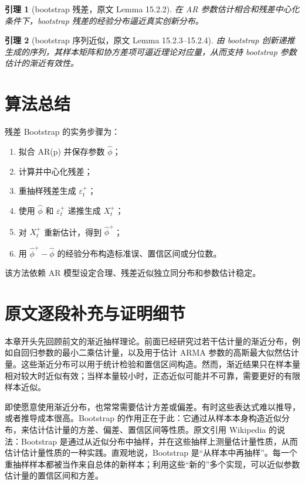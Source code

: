 \documentclass[11pt,a4paper]{ctexart}
\newtheorem{lemma}{引理}[section]
\begin{document}
\begin{lemma}[bootstrap 残差，原文 Lemma 15.2.2]
在 AR 参数估计相合和残差中心化条件下，bootstrap 残差的经验分布逼近真实创新分布。
\end{lemma}

\begin{lemma}[bootstrap 序列近似，原文 Lemma 15.2.3--15.2.4]
由 bootstrap 创新递推生成的序列，其样本矩阵和协方差项可逼近理论对应量，从而支持 bootstrap 参数估计的渐近有效性。
\end{lemma}

\section{算法总结}

残差 Bootstrap 的实务步骤为：
\begin{enumerate}
  \item 拟合 AR(p) 并保存参数 \(\hat\phi\)；
  \item 计算并中心化残差；
  \item 重抽样残差生成 \(\varepsilon_t^+\)；
  \item 使用 \(\hat\phi\) 和 \(\varepsilon_t^+\) 递推生成 \(X_t^+\)；
  \item 对 \(X_t^+\) 重新估计，得到 \(\hat\phi^+\)；
  \item 用 \(\hat\phi^+-\hat\phi\) 的经验分布构造标准误、置信区间或分位数。
\end{enumerate}

该方法依赖 AR 模型设定合理、残差近似独立同分布和参数估计稳定。

\section{原文逐段补充与证明细节}

本章开头先回顾前文的渐近抽样理论。前面已经研究过若干估计量的渐近分布，例如自回归参数的最小二乘估计量，以及用于估计 ARMA 参数的高斯最大似然估计量。这些渐近分布可以用于统计检验和置信区间构造。然而，渐近结果只在样本量相对较大时近似有效；当样本量较小时，正态近似可能并不可靠，需要更好的有限样本近似。

即使愿意使用渐近分布，也常常需要估计方差或偏差。有时这些表达式难以推导，或者推导成本很高。Bootstrap 的作用正在于此：它通过从样本本身构造近似分布，来估计估计量的方差、偏差、置信区间等性质。原文引用 Wikipedia 的说法：Bootstrap 是通过从近似分布中抽样，并在这些抽样上测量估计量性质，从而估计估计量性质的一种实践。直观地说，Bootstrap 是“从样本中再抽样”。每一个重抽样样本都被当作来自总体的新样本；利用这些“新的”多个实现，可以近似参数估计量的置信区间和方差。
\end{document}
